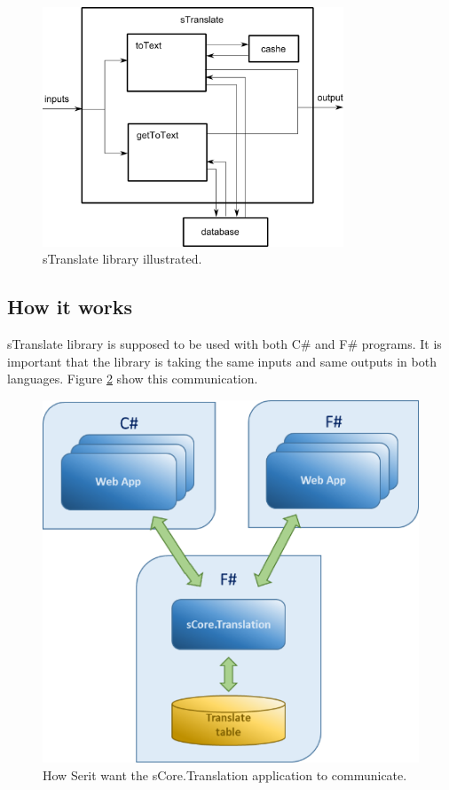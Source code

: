\documentclass[12pt, a4paper]{article}
\begin{document}
\begin{figure}[!h]
    \includegraphics[width=0.8\textwidth]{sTranslateWorkings}
    \centering
    \caption{sTranslate library illustrated.}
    \label{fig:sTranslateWorkings}
\end{figure}

\newpage
\subsection{How it works}
sTranslate library is supposed to be used with both C\# and F\# programs. It is important that the library is taking the same inputs and same outputs in both languages. Figure \ref{fig:sTranslate_communication} show this communication.

\begin{figure}[!h]
    \includegraphics[scale=0.5]{image02}
    \centering
    \caption{How Serit want the sCore.Translation application to communicate.}
    \label{fig:sTranslate_communication}
\end{figure}
\end{document}
